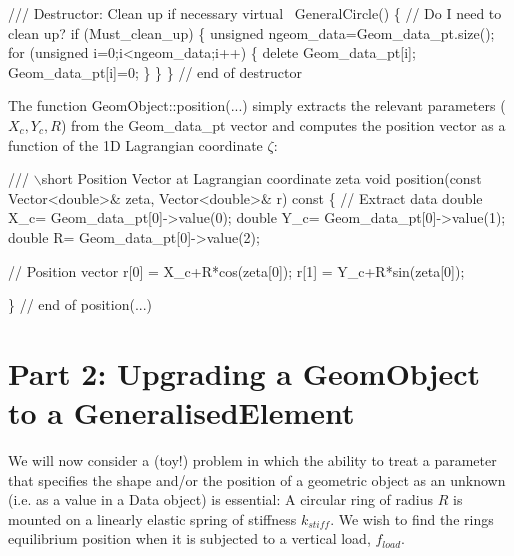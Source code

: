 \begin{DoxyCodeInclude}
 \textcolor{comment}{/// Destructor:  Clean up if necessary}
 \textcolor{keyword}{virtual} ~GeneralCircle()
  \{
   \textcolor{comment}{// Do I need to clean up?}
   \textcolor{keywordflow}{if} (Must\_clean\_up)
    \{
     \textcolor{keywordtype}{unsigned} ngeom\_data=Geom\_data\_pt.size();
     \textcolor{keywordflow}{for} (\textcolor{keywordtype}{unsigned} i=0;i<ngeom\_data;i++)
      \{
       \textcolor{keyword}{delete} Geom\_data\_pt[i];
       Geom\_data\_pt[i]=0;
      \}
    \}
  \} \textcolor{comment}{// end of destructor}

\end{DoxyCodeInclude}


The function {\ttfamily Geom\+Object\+::position}(...) simply extracts the relevant parameters ( $ X_c, Y_c, R $) from the {\ttfamily Geom\+\_\+data\+\_\+pt} vector and computes the position vector as a function of the 1D Lagrangian coordinate $ \zeta $\+:


\begin{DoxyCodeInclude}
 \textcolor{comment}{/// \(\backslash\)short Position Vector at Lagrangian coordinate zeta }
 \textcolor{keywordtype}{void} position(\textcolor{keyword}{const} Vector<double>& zeta, Vector<double>& r)\textcolor{keyword}{ const}
\textcolor{keyword}{  }\{
   \textcolor{comment}{// Extract data}
   \textcolor{keywordtype}{double} X\_c= Geom\_data\_pt[0]->value(0);
   \textcolor{keywordtype}{double} Y\_c= Geom\_data\_pt[0]->value(1);
   \textcolor{keywordtype}{double} R= Geom\_data\_pt[0]->value(2);

   \textcolor{comment}{// Position vector}
   r[0] = X\_c+R*cos(zeta[0]);
   r[1] = Y\_c+R*sin(zeta[0]);

  \} \textcolor{comment}{// end of position(...)}

\end{DoxyCodeInclude}




 

\hypertarget{index_example}{}\section{Part 2\+: Upgrading a Geom\+Object to a Generalised\+Element}\label{index_example}
We will now consider a (toy!) problem in which the ability to treat a parameter that specifies the shape and/or the position of a geometric object as an unknown (i.\+e. as a value in a {\ttfamily Data} object) is essential\+: A circular ring of radius $ R $ is mounted on a linearly elastic spring of stiffness $ k_{stiff} $. We wish to find the ring\textquotesingle{}s equilibrium position when it is subjected to a vertical load, $ f_{load} $.

